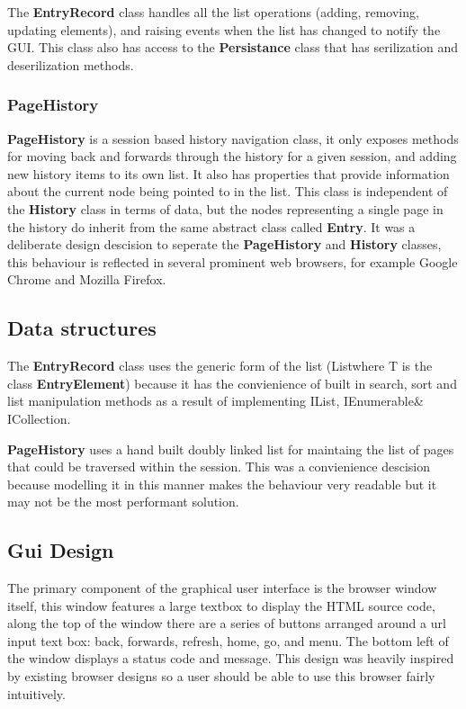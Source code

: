 \documentclass[../Main.tex]{subfiles}
\begin{document}
The \textbf{EntryRecord} class handles all the list operations (adding, removing, updating elements), and raising events when the list has changed to notify the GUI. This class also has access to the \textbf{Persistance} class that has serilization and deserilization methods.

\subsubsection{PageHistory}
\textbf{PageHistory} is a session based history navigation class, it only exposes methods for moving back and forwards through the history for a given session, and adding new history items to its own list. 
It also has properties that provide information about the current node being pointed to in the list. 
This class is independent of the \textbf{History} class in terms of data, but the nodes representing a single page in the history do inherit from the same abstract class called \textbf{Entry}.
It was a deliberate design descision to seperate the \textbf{PageHistory} and \textbf{History} classes, this behaviour is reflected in several prominent web browsers, for example Google Chrome and Mozilla Firefox.


\subsection{Data structures}

The \textbf{EntryRecord} class uses the generic form of the list (List\genT where T is the class \textbf{EntryElement}) because it has the convienience of built in search, sort and list manipulation methods as a result of implementing IList\genT, IEnumerable\genT  \& ICollection\genT.~\autocite{dotnet-botListClassSystem}

\textbf{PageHistory} uses a hand built doubly linked list for maintaing the list of pages that could be traversed within the session. This was a convienience descision because modelling it in this manner makes the behaviour very readable but it may not be the most performant solution.

\subsection{Gui Design}\label{subsec:GuiDes}

The primary component of the graphical user interface is the browser window itself, this window features a large textbox to display the HTML source code, along the top of the window there are a series of buttons arranged around a url input text box: back, forwards, refresh, home, go, and menu. The bottom left of the window displays a status code and message.
This design was heavily inspired by existing browser designs so a user should be able to use this browser fairly intuitively.
\end{document}
